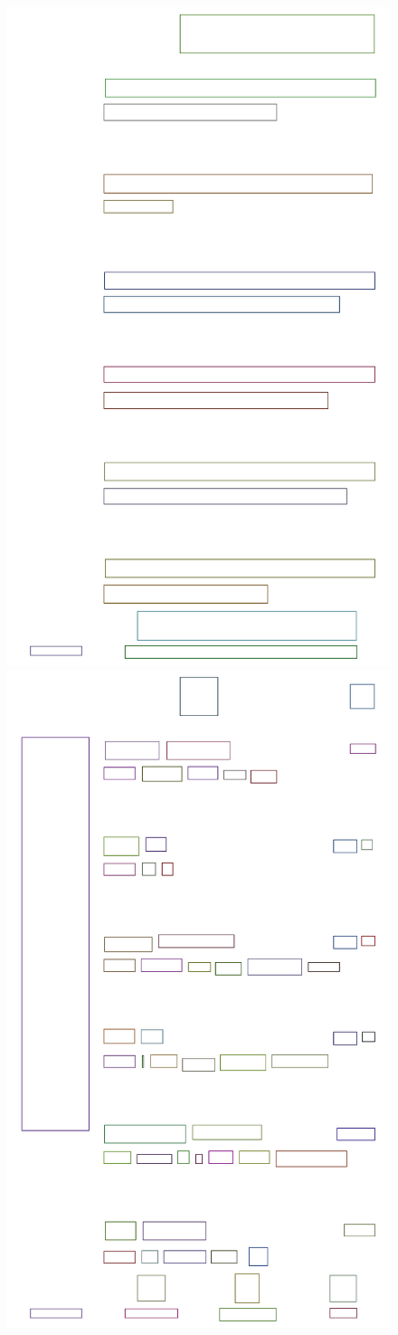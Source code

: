 \documentclass[12pt,twocolumn]{article}
\begin{document}
\begin{figure}[ht]
\centerline{
\includegraphics[width=0.5\columnwidth]{images/ocr/lineBoundingBoxes.png}
\includegraphics[width=0.5\columnwidth]{images/ocr/wordBoundingBoxes.png}
}
\end{figure}
\end{document}
